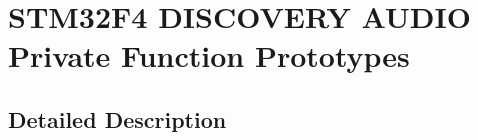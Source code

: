 \hypertarget{group___s_t_m32_f4___d_i_s_c_o_v_e_r_y___a_u_d_i_o___private___function___prototypes}{}\section{S\+T\+M32\+F4 D\+I\+S\+C\+O\+V\+E\+RY A\+U\+D\+IO Private Function Prototypes}
\label{group___s_t_m32_f4___d_i_s_c_o_v_e_r_y___a_u_d_i_o___private___function___prototypes}


\subsection{Detailed Description}
